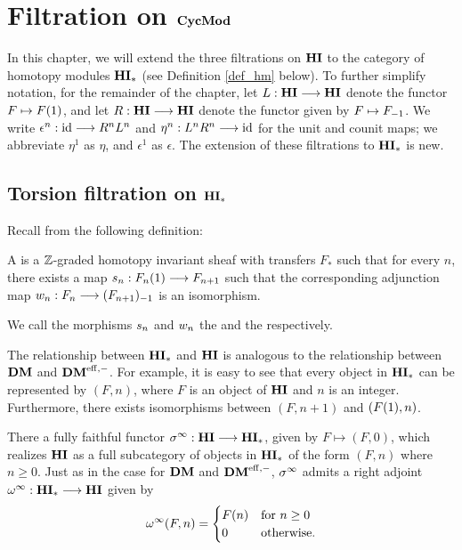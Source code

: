 \newpage
\chapter{Filtration on $\CycMod$}\label{sect_filtration_cycmod}

In this chapter, we will extend the three filtrations on
$\HI$ to the category of homotopy modules $\HM$ (see Definition
\ref{def_hm} below). To further simplify notation, for the
remainder of the chapter, let $L: \HI \to \HI$ denote the functor 
$F \mapsto \LHI{F}$, and let $R: \HI \to \HI$ denote the functor 
given by $F \mapsto \RHI{F}$. We write $\epsilon^n : \id \to 
R^nL^n$ and $\eta^n: L^nR^n \to \id$ for the unit and counit maps; 
we abbreviate $\eta^1$ as $\eta$, and $\epsilon^1$ as $\epsilon$.
The extension of these filtrations to $\HM$ is new.

\section{Torsion filtration on $\HM$}


Recall from \cite[1.17]{DegModHom} the following definition:

\begin{defn}\label{def_hm}
A  is a $\Z$-graded homotopy 
invariant sheaf with transfers $F_*$ such that for every $n$, 
there exists a map $\susp_n: \LHI{F_n} \to F_{n+1}$ such that the 
corresponding adjunction map $\deloop_n: F_n \to \RHI{(F_{n+1})}$
is an isomorphism.

We call the morphisms $\susp_n$ and $\deloop_n$ the  and the  respectively.
\end{defn}

The relationship between $\HM$ and $\HI$ is analogous to the 
relationship between $\DM$ and $\DMeff$. For example, it is easy 
to see that every object in $\HM$ can be represented by $(F, n)$, 
where $F$ is an object of $\HI$ and $n$ is an integer. 
Furthermore, there exists isomorphisms between $(F, n + 1)$ and
$(\LHI{F}, n)$. 

There a fully faithful functor $\spectHI : \HI \to \HM$, given by 
$F \mapsto (F, 0)$, which realizes $\HI$ as a full subcategory of 
objects in $\HM$ of the form $(F, n)$ where $n \geq 0$. Just as in
the case for $\DM$ and $\DMeff$, $\spectHI$ admits a right adjoint
$\loopHM : \HM \to \HI$ given by 
\[
\loopHM(F, n) = \begin{cases}
\LHI[n]F &\textrm{for }n \geq 0\\
0 &\textrm{otherwise}.
\end{cases}
\]

